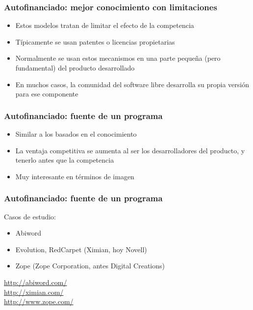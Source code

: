 
\begin{frame}
\frametitle{Autofinanciado: mejor conocimiento con limitaciones}

\begin{itemize}
\item Estos modelos tratan de limitar el efecto de la competencia
\item Típicamente se usan patentes o licencias propietarias
\item Normalmente se usan estos mecanismos en una parte pequeña (pero
  fundamental) del producto desarrollado
\item En muchos casos, la comunidad del software libre desarrolla su
  propia versión para ese componente
\end{itemize}


\end{frame}


\begin{frame}
\frametitle{Autofinanciado: fuente de un programa}

\begin{itemize}
\item Similar a los basados en el conocimiento
\item La ventaja competitiva se aumenta al ser los desarrolladores del
  producto, y tenerlo antes que la competencia
\item Muy interesante en términos de imagen

\end{itemize}

\end{frame}


\begin{frame}
\frametitle{Autofinanciado: fuente de un programa}

Casos de estudio:
\begin{itemize}
\item Abiword
\item Evolution, RedCarpet (Ximian, hoy Novell)
\item Zope (Zope Corporation, antes Digital Creations)
\end{itemize}

\begin{flushright}
\url{http://abiword.com/} \\
\url{http://ximian.com/} \\
\url{http://www.zope.com/}
\end{flushright}

\end{frame}

